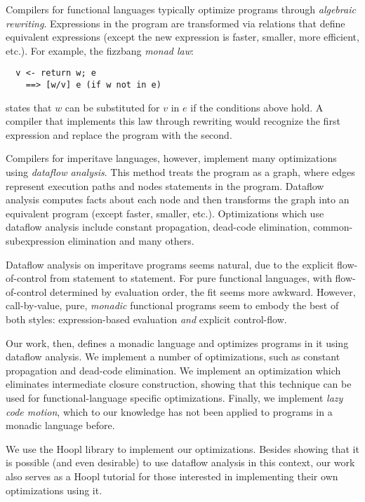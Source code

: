 \documentclass[11pt]{article}
\begin{document}
Compilers for functional languages typically 
optimize programs through \emph{algebraic rewriting}. Expressions in
the program are transformed via relations that define equivalent
expressions (except the new expression is faster, smaller, more
efficient, etc.). For example, the fizzbang \emph{monad law}:

\begin{verbatim}
  v <- return w; e 
    ==> [w/v] e (if w not in e)
\end{verbatim}

states that $w$ can be substituted for $v$ in $e$ if the conditions
above hold. A compiler that implements this law through rewriting would
recognize the first expression and replace the program with the second.

Compilers for imperitave languages, however, implement many
optimizations using \emph{dataflow analysis}. This method treats the
program as a graph, where edges represent execution paths and nodes
statements in the program. Dataflow analysis computes facts about each
node and then transforms the graph into an equivalent program (except
faster, smaller, etc.). Optimizations which use dataflow analysis
include constant propagation, dead-code elimination,
common-subexpression elimination and many others.

Dataflow analysis on imperitave programs seems natural, due to the
explicit flow-of-control from statement to statement. For pure
functional languages, with flow-of-control determined by evaluation
order, the fit seems more awkward. However, call-by-value, pure,
\emph{monadic} functional programs seem to embody the best of both
styles: expression-based evaluation \emph{and} explicit
control-flow. 

Our work, then, defines a monadic language and optimizes programs in
it using dataflow analysis. We implement a number of optimizations,
such as constant propagation and dead-code elimination. We implement
an optimization which eliminates intermediate closure construction,
showing that this technique can be used for functional-language
specific optimizations. Finally, we implement \emph{lazy code motion},
which to our knowledge has not been applied to programs in a monadic
language before.


We use the Hoopl library  to implement our
optimizations.  Besides showing that it is possible (and even
desirable) to use dataflow analysis in this context, our work 
also serves as a Hoopl tutorial for those interested in implementing
their own optimizations using it. 
\end{document}
